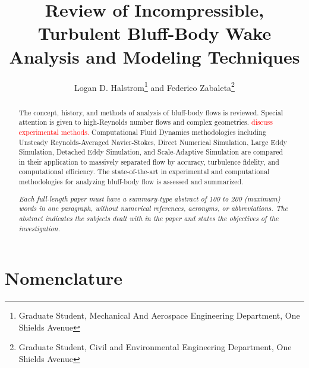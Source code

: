 \documentclass[journal]{new-aiaa}
\title{Review of Incompressible, Turbulent Bluff-Body Wake Analysis and Modeling Techniques}
\author{Logan D. Halstrom\footnote{Graduate Student, Mechanical And Aerospace Engineering Department, One Shields Avenue} and Federico Zabaleta\footnote{Graduate Student, Civil and Environmental Engineering Department, One Shields Avenue}}
\affil{University of California, Davis, California, 95616}
\begin{document}
\maketitle

\begin{abstract} %

The concept, history, and methods of analysis of bluff-body flows is reviewed. Special attention is given to high-Reynolds number flows and complex geometries. \textcolor{red}{discuss experimental methods.} Computational Fluid Dynamics methodologies including Unsteady Reynolds-Averaged Navier-Stokes, Direct Numerical Simulation, Large Eddy Simulation, Detached Eddy Simulation, and Scale-Adaptive Simulation are compared in their application to massively separated flow by accuracy, turbulence fidelity, and computational efficiency. The state-of-the-art in experimental and computational methodologies for analyzing bluff-body flow is assessed and summarized.


\emph{Each full-length paper must have a summary-type abstract of 100 to 200 (maximum) words in one paragraph, without numerical references, acronyms, or abbreviations. The abstract indicates the subjects dealt with in the paper and states the objectives of the investigation.}

\end{abstract}



\section*{Nomenclature} %
\end{document}
